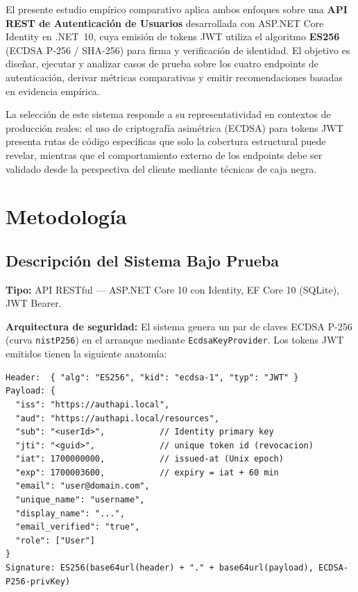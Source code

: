 \documentclass[11pt,a4paper]{article}
\begin{document}
El presente estudio empírico comparativo aplica ambos enfoques sobre una \textbf{API REST de Autenticación de Usuarios} desarrollada con ASP.NET Core Identity en .NET~10, cuya emisión de tokens JWT utiliza el algoritmo \textbf{ES256} (ECDSA P-256 / SHA-256) para firma y verificación de identidad. El objetivo es diseñar, ejecutar y analizar casos de prueba sobre los cuatro endpoints de autenticación, derivar métricas comparativas y emitir recomendaciones basadas en evidencia empírica.

La selección de este sistema responde a su representatividad en contextos de producción reales: el uso de criptografía asimétrica (ECDSA) para tokens JWT presenta rutas de código específicas que solo la cobertura estructural puede revelar, mientras que el comportamiento externo de los endpoints debe ser validado desde la perspectiva del cliente mediante técnicas de caja negra.

\section{Metodología}

\subsection{Descripción del Sistema Bajo Prueba}

\noindent\textbf{Tipo:} API RESTful — ASP.NET Core 10 con Identity, EF Core 10 (SQLite), JWT Bearer.

\noindent\textbf{Arquitectura de seguridad:}
El sistema genera un par de claves ECDSA P-256 (curva \texttt{nistP256}) en el arranque mediante \texttt{EcdsaKeyProvider}. Los tokens JWT emitidos tienen la siguiente anatomía:

\begin{lstlisting}[language={},caption={Estructura del JWT emitido (ES256)}]
Header:  { "alg": "ES256", "kid": "ecdsa-1", "typ": "JWT" }
Payload: {
  "iss": "https://authapi.local",
  "aud": "https://authapi.local/resources",
  "sub": "<userId>",           // Identity primary key
  "jti": "<guid>",             // unique token id (revocacion)
  "iat": 1700000000,           // issued-at (Unix epoch)
  "exp": 1700003600,           // expiry = iat + 60 min
  "email": "user@domain.com",
  "unique_name": "username",
  "display_name": "...",
  "email_verified": "true",
  "role": ["User"]
}
Signature: ES256(base64url(header) + "." + base64url(payload), ECDSA-P256-privKey)
\end{lstlisting}
\end{document}
